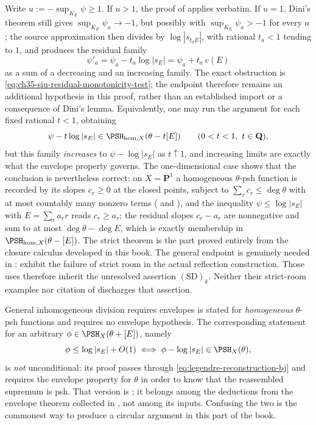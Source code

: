 \begin{remark}
\label{rem:ch35-siu-boundary}
Write $u:=-\sup_{K_E}\psi\geq1$.  If $u>1$, the proof of
 applies verbatim.  If $u=1$, Dini's
theorem still gives $\sup_{K_E}\psi_a\to-1$, but possibly with
$\sup_{K_E}\psi_a>-1$ for every $a$; the source approximation then
divides by $\log|s_{t_aE}|$, with rational $t_a<1$ tending to $1$,
and produces the residual family
\[
 \psi'_a=\psi_a-t_a\log|s_E|=\psi_a+t_a\,v(E)
\]
as a sum of a decreasing and an increasing family.  The exact obstruction
is \eqref{eq:ch35-siu-residual-monotonicity-test}; the endpoint therefore
remains an additional hypothesis in this proof, rather than an established
import or a consequence of Dini's lemma.
Equivalently, one may
run the argument for each fixed rational $t<1$, obtaining
\[
 \psi-t\log|s_E|\in\PSH_{\mathrm{hom},X}(\theta-t[E])
 \qquad(0<t<1,\ t\in\mathbf Q),
\]
but this family \emph{increases} to $\psi-\log|s_E|$ as $t\uparrow1$,
and increasing limits are exactly what the envelope property governs.  The
one-dimensional case shows that the conclusion is nevertheless correct: on
$X=\mathbf P^1$ a homogeneous $\theta$-psh function is recorded by its
slopes $c_r\geq0$ at the closed points, subject to
$\sum_rc_r\leq\deg\theta$ with at most countably many nonzero terms
( and ), and
the inequality $\psi\leq\log|s_E|$ with $E=\sum_ra_rr$ reads
$c_r\geq a_r$; the residual slopes $c_r-a_r$ are nonnegative and sum to
at most $\deg\theta-\deg E$, which is exactly membership in
$\PSH_{\mathrm{hom},X}(\theta-[E])$.  The strict theorem
 is the part proved entirely from the closure
calculus developed in this book.  The general endpoint
 is genuinely needed in
:
 exhibit the
failure of strict room in the actual reflection construction.  Those uses
therefore inherit the unresolved assertion $\mathrm{(SD)}_k$. Neither
their strict-room examples nor citation of \cite[Theorem~6.21]{BJ22}
discharges that assertion.
\end{remark}

\begin{warning}{General inhomogeneous division requires envelopes}
 is stated for \emph{homogeneous}
$\theta$-psh functions and requires no envelope hypothesis.  The
corresponding statement for an arbitrary $\phi\in\PSH_X(\theta+[E])$,
namely
\[
 \phi\leq\log|s_E|+O(1)\iff\phi-\log|s_E|\in\PSH_X(\theta),
\]
is \emph{not} unconditional: its proof passes through
\eqref{eq:legendre-reconstruction-bj} and requires the envelope property for
$\theta$ in order to know that the reassembled supremum is psh.  That
version is \cite[Theorem~6.31]{BJ22}; it belongs among the deductions from
the envelope theorem collected in
, not among its inputs.  Confusing the
two is the commonest way to produce a circular argument in this part of the
book.
\end{warning}

